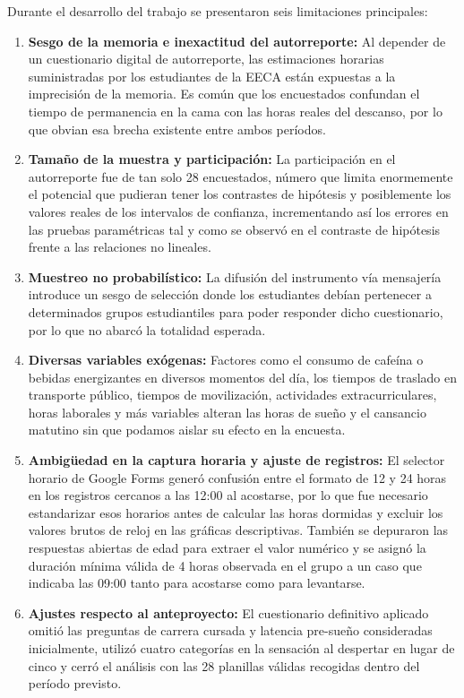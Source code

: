 \documentclass[12pt, letterpaper]{article}
\begin{document}
Durante el desarrollo del trabajo se presentaron seis limitaciones principales:

\begin{enumerate}
    \item \textbf{Sesgo de la memoria e inexactitud del autorreporte:} Al depender de un cuestionario digital de autorreporte, las estimaciones horarias suministradas por los estudiantes de la EECA están expuestas a la imprecisión de la memoria. Es común que los encuestados confundan el tiempo de permanencia en la cama con las horas reales del descanso, por lo que obvian esa brecha existente entre ambos períodos.

    \item \textbf{Tamaño de la muestra y participación:} La participación en el autorreporte fue de tan solo 28 encuestados, número que limita enormemente el potencial que pudieran tener los contrastes de hipótesis y posiblemente los valores reales de los intervalos de confianza, incrementando así los errores en las pruebas paramétricas tal y como se observó en el contraste de hipótesis frente a las relaciones no lineales.

    \item \textbf{Muestreo no probabilístico:} La difusión del instrumento vía mensajería introduce un sesgo de selección donde los estudiantes debían pertenecer a determinados grupos estudiantiles para poder responder dicho cuestionario, por lo que no abarcó la totalidad esperada.

    \item \textbf{Diversas variables exógenas:} Factores como el consumo de cafeína o bebidas energizantes en diversos momentos del día, los tiempos de traslado en transporte público, tiempos de movilización, actividades extracurriculares, horas laborales y más variables alteran las horas de sueño y el cansancio matutino sin que podamos aislar su efecto en la encuesta.

    \item \textbf{Ambigüedad en la captura horaria y ajuste de registros:} El selector horario de Google Forms generó confusión entre el formato de 12 y 24 horas en los registros cercanos a las 12:00 al acostarse, por lo que fue necesario estandarizar esos horarios antes de calcular las horas dormidas y excluir los valores brutos de reloj en las gráficas descriptivas. También se depuraron las respuestas abiertas de edad para extraer el valor numérico y se asignó la duración mínima válida de 4 horas observada en el grupo a un caso que indicaba las 09:00 tanto para acostarse como para levantarse.

    \item \textbf{Ajustes respecto al anteproyecto:} El cuestionario definitivo aplicado omitió las preguntas de carrera cursada y latencia pre-sueño consideradas inicialmente, utilizó cuatro categorías en la sensación al despertar en lugar de cinco y cerró el análisis con las 28 planillas válidas recogidas dentro del período previsto.
\end{enumerate}
\end{document}
